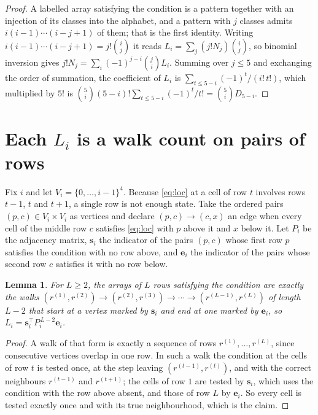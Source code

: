 \documentclass[11pt,a4paper]{article}
\theoremstyle{plain}
\newtheorem{lemma}[theorem]{Lemma}
\theoremstyle{definition}
\begin{document}
\begin{proof}
A labelled array satisfying the condition is a pattern together with an injection of its
classes into the alphabet, and a pattern with $j$ classes admits $i(i-1)\cdots(i-j+1)$ of
them; that is the first identity. Writing $i(i-1)\cdots(i-j+1)=j!\binom{i}{j}$ it reads
$L_i=\sum_j(j!N_j)\binom{i}{j}$, so binomial inversion gives
$j!N_j=\sum_i(-1)^{j-i}\binom{j}{i}L_i$. Summing over $j\le5$ and exchanging the
order of summation, the coefficient of $L_i$ is
$\sum_{t\le5-i}(-1)^t/(i!\,t!)$, which multiplied by $5!$ is
$\binom{5}{i}(5-i)!\sum_{t\le5-i}(-1)^t/t!=\binom{5}{i}D_{5-i}$.
\end{proof}

\section{Each $L_i$ is a walk count on pairs of rows}

Fix $i$ and let $V_i=\{0,\dots,i-1\}^{4}$. Because \eqref{eq:loc} at a cell of row
$t$ involves rows $t-1$, $t$ and $t+1$, a single row is not enough state. Take the
ordered pairs $(p,c)\in V_i\times V_i$ as vertices and declare $(p,c)\to(c,x)$ an edge when
every cell of the middle row $c$ satisfies \eqref{eq:loc} with $p$ above it and $x$
below it. Let $P_i$ be the adjacency matrix, $\mathbf{s}_i$ the indicator of the pairs
$(p,c)$ whose first row $p$ satisfies the condition with no row above, and
$\mathbf{e}_i$ the indicator of the pairs whose second row $c$ satisfies it with no
row below.

\begin{lemma}\label{lem:walk}
For $L\ge2$, the arrays of $L$ rows satisfying the condition are exactly the walks
$(r^{(1)},r^{(2)})\to(r^{(2)},r^{(3)})\to\cdots\to(r^{(L-1)},r^{(L)})$ of length
$L-2$ that start at a vertex marked by $\mathbf{s}_i$ and end at one marked by
$\mathbf{e}_i$, so
$L_i=\mathbf{s}_i^{\!\top}P_i^{\,L-2}\mathbf{e}_i$.
\end{lemma}

\begin{proof}
A walk of that form is exactly a sequence of rows $r^{(1)},\dots,r^{(L)}$, since
consecutive vertices overlap in one row. In such a walk the condition at the cells of
row $t$ is tested once, at the step leaving $(r^{(t-1)},r^{(t)})$, and with the
correct neighbours $r^{(t-1)}$ and $r^{(t+1)}$; the cells of row $1$ are tested by
$\mathbf{s}_i$, which uses the condition with the row above absent, and those of row
$L$ by $\mathbf{e}_i$. So every cell is tested exactly once and with its true
neighbourhood, which is the claim.
\end{proof}
\end{document}
